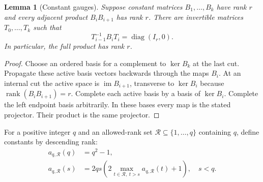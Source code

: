 \documentclass[11pt]{article}
\newtheorem{lemma}[theorem]{Lemma}
\theoremstyle{definition}\newtheorem{definition}[theorem]{Definition}
\theoremstyle{remark}\newtheorem{remark}[theorem]{Remark}
\newcommand{\rank}{\operatorname{rank}}
\newcommand{\im}{\operatorname{im}}
\begin{document}
\begin{lemma}[Constant gauges]\label{lem:gauge}
Suppose constant matrices $B_1,\ldots,B_k$ have rank $r$ and every adjacent
product $B_iB_{i+1}$ has rank $r$. There are invertible matrices
$T_0,\ldots,T_k$ such that
\[
 T_{i-1}^{-1}B_iT_i=\operatorname{diag}(I_r,0).
\]
In particular, the full product has rank $r$.
\end{lemma}
\begin{proof}
Choose an ordered basis for a complement to $\ker B_k$ at the last cut.
Propagate these active basis vectors backwards through the maps $B_i$.
At an internal cut the active space is $\im B_{i+1}$, transverse to
$\ker B_i$ because $\rank(B_iB_{i+1})=r$. Complete each active basis by a
basis of $\ker B_i$. Complete the left endpoint basis arbitrarily. In these
bases every map is the stated projector. Their product is the same
projector.
\end{proof}

For a positive integer $q$ and an allowed-rank set
$\mathcal R\subseteq\{1,\ldots,q\}$ containing $q$, define constants by
descending rank:
\begin{align}
 a_{q,\mathcal R}(q)&=q^2-1,\label{eq:base}\tag{4.1}\\
 a_{q,\mathcal R}(s)&=2qs\left(2\max_{t\in\mathcal R,\ t>s}
              a_{q,\mathcal R}(t)+1\right),\quad s<q.
 \label{eq:recurrence}\tag{4.2}
\end{align}
\end{document}
